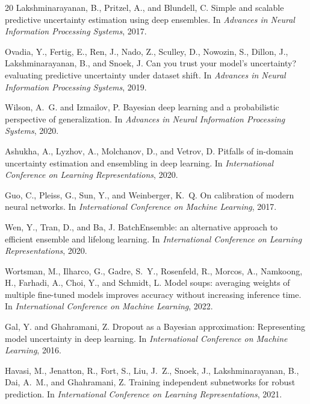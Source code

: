 \documentclass[11pt]{article}
\begin{document}
\begin{thebibliography}{20}
Lakshminarayanan, B., Pritzel, A., and Blundell, C.
\newblock Simple and scalable predictive uncertainty estimation using deep
  ensembles.
\newblock In \emph{Advances in Neural Information Processing Systems}, 2017.

Ovadia, Y., Fertig, E., Ren, J., Nado, Z., Sculley, D., Nowozin, S.,
  Dillon, J., Lakshminarayanan, B., and Snoek, J.
\newblock Can you trust your model's uncertainty? evaluating predictive
  uncertainty under dataset shift.
\newblock In \emph{Advances in Neural Information Processing Systems}, 2019.

Wilson, A.~G. and Izmailov, P.
\newblock Bayesian deep learning and a probabilistic perspective of
  generalization.
\newblock In \emph{Advances in Neural Information Processing Systems}, 2020.

Ashukha, A., Lyzhov, A., Molchanov, D., and Vetrov, D.
\newblock Pitfalls of in-domain uncertainty estimation and ensembling in deep
  learning.
\newblock In \emph{International Conference on Learning Representations}, 2020.

Guo, C., Pleiss, G., Sun, Y., and Weinberger, K.~Q.
\newblock On calibration of modern neural networks.
\newblock In \emph{International Conference on Machine Learning}, 2017.

Wen, Y., Tran, D., and Ba, J.
\newblock BatchEnsemble: an alternative approach to efficient ensemble and
  lifelong learning.
\newblock In \emph{International Conference on Learning Representations}, 2020.

Wortsman, M., Ilharco, G., Gadre, S.~Y., Rosenfeld, R., Morcos, A., Namkoong,
  H., Farhadi, A., Choi, Y., and Schmidt, L.
\newblock Model soups: averaging weights of multiple fine-tuned models improves
  accuracy without increasing inference time.
\newblock In \emph{International Conference on Machine Learning}, 2022.

Gal, Y. and Ghahramani, Z.
\newblock Dropout as a Bayesian approximation: Representing model uncertainty
  in deep learning.
\newblock In \emph{International Conference on Machine Learning}, 2016.

Havasi, M., Jenatton, R., Fort, S., Liu, J.~Z., Snoek, J., Lakshminarayanan,
  B., Dai, A.~M., and Ghahramani, Z.
\newblock Training independent subnetworks for robust prediction.
\newblock In \emph{International Conference on Learning Representations}, 2021.


\end{thebibliography}
\end{document}
